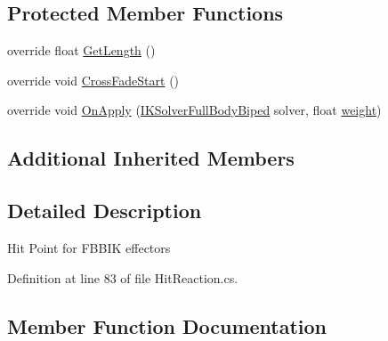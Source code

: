 \subsection*{Protected Member Functions}
\begin{DoxyCompactItemize}
\item 
override float \mbox{\hyperlink{class_root_motion_1_1_final_i_k_1_1_hit_reaction_1_1_hit_point_effector_a704a13bf68058020ef0e636f70002629}{Get\+Length}} ()
\item 
override void \mbox{\hyperlink{class_root_motion_1_1_final_i_k_1_1_hit_reaction_1_1_hit_point_effector_a259432fab90edf73a38e890e4c52a643}{Cross\+Fade\+Start}} ()
\item 
override void \mbox{\hyperlink{class_root_motion_1_1_final_i_k_1_1_hit_reaction_1_1_hit_point_effector_a165bed844ab2e9154ea402b8d6029c43}{On\+Apply}} (\mbox{\hyperlink{class_root_motion_1_1_final_i_k_1_1_i_k_solver_full_body_biped}{I\+K\+Solver\+Full\+Body\+Biped}} solver, float \mbox{\hyperlink{class_root_motion_1_1_final_i_k_1_1_offset_modifier_a3a2cd2134e8a197e6a77b48fcf9aa5d4}{weight}})
\end{DoxyCompactItemize}
\subsection*{Additional Inherited Members}


\subsection{Detailed Description}
Hit Point for F\+B\+B\+IK effectors 



Definition at line 83 of file Hit\+Reaction.\+cs.



\subsection{Member Function Documentation}
\mbox{\label{class_root_motion_1_1_final_i_k_1_1_hit_reaction_1_1_hit_point_effector_a259432fab90edf73a38e890e4c52a643}} 
